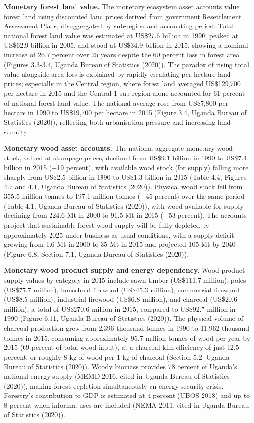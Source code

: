 \documentclass[
  letterpaper,
  DIV=11,
  numbers=noendperiod]{scrartcl}
\begin{document}
\textbf{Monetary forest land value.} The monetary ecosystem asset
accounts value forest land using discounted land prices derived from
government Resettlement Assessment Plans, disaggregated by sub-region
and accounting period. Total national forest land value was estimated at
US\$27.6 billion in 1990, peaked at US\$62.9 billion in 2005, and stood
at US\$34.9 billion in 2015, showing a nominal increase of 26.7 percent
over 25 years despite the 60 percent loss in forest area (Figures
3.3-3.4, Uganda Bureau of Statistics (2020)). The paradox of rising
total value alongside area loss is explained by rapidly escalating
per-hectare land prices; especially in the Central region, where forest
land averaged US\$129,700 per hectare in 2015 and the Central 1
sub-region alone accounted for 61 percent of national forest land value.
The national average rose from US\$7,800 per hectare in 1990 to
US\$19,700 per hectare in 2015 (Figure 3.4, Uganda Bureau of Statistics
(2020)), reflecting both urbanisation pressure and increasing land
scarcity.

\textbf{Monetary wood asset accounts.} The national aggregate monetary
wood stock, valued at stumpage prices, declined from US\$9.1 billion in
1990 to US\$7.4 billion in 2015 (−19 percent), with available wood stock
(for supply) falling more sharply from US\$2.5 billion in 1990 to
US\$1.3 billion in 2015 (Table 4.4, Figures 4.7 and 4.1, Uganda Bureau
of Statistics (2020)). Physical wood stock fell from 355.5 million
tonnes to 197.1 million tonnes (−45 percent) over the same period (Table
4.1, Uganda Bureau of Statistics (2020)), with wood available for supply
declining from 224.6 Mt in 2000 to 91.5 Mt in 2015 (−53 percent). The
accounts project that sustainable forest wood supply will be fully
depleted by approximately 2025 under business-as-usual conditions, with
a supply deficit growing from 1.6 Mt in 2000 to 35 Mt in 2015 and
projected 105 Mt by 2040 (Figure 6.8, Section 7.1, Uganda Bureau of
Statistics (2020)).

\textbf{Monetary wood product supply and energy dependency.} Wood
product supply values by category in 2015 include sawn timber (US\$111.7
million), poles (US\$77.7 million), household firewood (US\$45.3
million), commercial firewood (US\$8.5 million), industrial firewood
(US\$6.8 million), and charcoal (US\$20.6 million); a total of US\$270.6
million in 2015, compared to US\$92.7 million in 1990 (Figure 6.11,
Uganda Bureau of Statistics (2020)). The physical volume of charcoal
production grew from 2,396 thousand tonnes in 1990 to 11,962 thousand
tonnes in 2015, consuming approximately 95.7 million tonnes of wood per
year by 2015 (69 percent of total wood input), at a charcoal kiln
efficiency of just 12.5 percent, or roughly 8 kg of wood per 1 kg of
charcoal (Section 5.2, Uganda Bureau of Statistics (2020)). Woody
biomass provides 78 percent of Uganda's national energy supply (MEMD
2016, cited in Uganda Bureau of Statistics (2020)), making forest
depletion simultaneously an energy security crisis. Forestry's
contribution to GDP is estimated at 4 percent (UBOS 2018) and up to 8
percent when informal uses are included (NEMA 2011, cited in Uganda
Bureau of Statistics (2020)).
\end{document}
